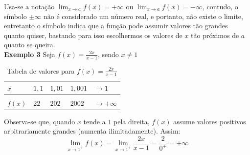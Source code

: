 \quad Usa-se a notação $\displaystyle \lim_{x \to a} f(x) = + \infty$ ou $\displaystyle \lim_{x \to a} f(x) = - \infty$, contudo, o símbolo $\pm \infty$ não é considerado um número real, e portanto, não existe o limite, entretanto o símbolo indica que a função pode assumir valores tão grandes quanto quiser, bastando para isso escolhermos os valores de $x$ tão próximos de $a$ quanto se queira.\\

\textbf{Exemplo 3} Seja $\displaystyle f(x) = \frac{2x}{x-1}$, sendo $x \neq 1$


\begin{table}[H]
\centering
\caption{Tabela de valores para $\displaystyle f(x) = \frac{2x}{x-1}$}
\label{tab:tab2}
\smallskip
\begin{tabular}{l|l|l|l|l}
\hline
 $x$ & $1,1$ & $1,01$ & $1,001$ & $\to 1$ \\[0.5ex]
\hline
&&&&\\[-2ex]
$f(x)$ & $22$ &  $202$ &  $2002$& $\to + \infty$\\[0.5ex]
\hline
\end{tabular}
\end{table}

Observa-se que, quando $x$ tende a $1$ pela direita,  $f(x)$ assume valores positivos arbitrariamente grandes (aumenta ilimitadamente). Assim:
$$
\lim_{x \to 1^+} f(x) = \lim_{x \to 1^+} \frac{2x}{x-1} =  \frac{2}{0^+} = + \infty
$$


